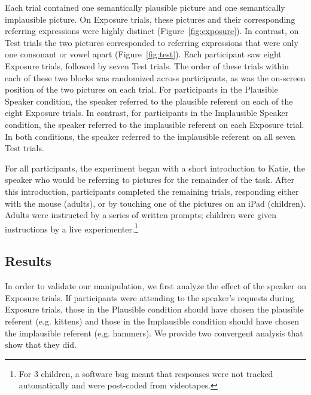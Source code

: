 \documentclass[man,floatsintext]{apa6}
\begin{document}
Each trial contained one semantically plausible picture and one semantically implausible picture. On Exposure trials, these pictures and their corresponding referring expressions were highly distinct (Figure~\ref{fig:exposure}). In contrast, on Test trials the two pictures corresponded to referring expressions that were only one consonant or vowel apart (Figure~\ref{fig:test}). Each participant saw eight Exposure trials, followed by seven Test trials. The order of these trials within each of these two blocks was randomized across participants, as was the on-screen position of the two pictures on each trial. For participants in the Plausible Speaker condition, the speaker referred to the plausible referent on each of the eight Exposure trials. In contrast, for participants in the Implausible Speaker condition, the speaker referred to the implausible referent on each Exposure trial. In both conditions, the speaker referred to the implausible referent on all seven Test trials.

For all participants, the experiment began with a short introduction to Katie, the speaker who would be referring to pictures for the remainder of the task. After this introduction, participants completed the remaining trials, responding either with the mouse (adults), or by touching one of the pictures on an iPad (children). Adults were instructed by a series of written prompts; children were given instructions by a live experimenter.\footnote{For 3 children, a software bug meant that responses were not tracked automatically and were post-coded from videotapes.}

\subsection{Results}

In order to validate our manipulation, we first analyze the effect of the speaker on Exposure trials. If participants were attending to the speaker's requests during Exposure trials, those in the Plausible condition should have chosen the plausible referent (e.g. kittens) and those in the Implausible condition should have chosen the implausible referent (e.g. hammers). We provide two convergent analysis that show that they did. 
\end{document}
